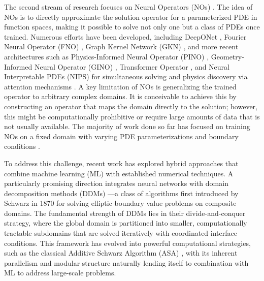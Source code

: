 \documentclass[preprint,11pt]{elsarticle}
\theoremstyle{plain}
\begin{document}
The second stream of research focuses on Neural Operators (NOs) \cite{kovachki2023neural}. The idea of NOs is to directly approximate the solution operator for a parameterized PDE in function spaces, making it possible to solve not only one but a class of PDEs once trained. Numerous efforts have been developed, including DeepONet \cite{lu2019deeponet}, Fourier Neural Operator (FNO) \cite{li2020fourier}, Graph Kernel Network (GKN) \cite{li2020neural}, and more recent architectures such as Physics-Informed Neural Operator (PINO) \cite{li2024physics}, Geometry-Informed Neural Operator (GINO) \cite{li2023geometry}, Transformer Operator \cite{calvello2024continuum}, and Neural Interpretable PDEs (NIPS) for simultaneous solving and physics discovery via attention mechanisms  \cite{liu2025neural}. A key limitation of NOs is generalizing the trained operator to arbitrary complex domains. It is conceivable to achieve this by constructing an operator that maps the domain directly to the solution; however, this might be computationally prohibitive or require large amounts of data that is not usually available. The majority of work done so far has focused on training NOs on a fixed domain with varying PDE parameterizations and boundary conditions \cite{goswami2023physics, li2023fourier}.

To address this challenge, recent work has explored hybrid approaches that combine machine learning (ML) with established numerical techniques. A particularly promising direction integrates neural networks with domain decomposition methods (DDMs) \cite{schwarz1870ueber, lions1988schwarz, smith1997domain, toselli2004domain}---a class of algorithms first introduced by Schwarz in 1870 for solving elliptic boundary value problems on composite domains. The fundamental strength of DDMs lies in their divide-and-conquer strategy, where the global domain is partitioned into smaller, computationally tractable subdomains that are solved iteratively with coordinated interface conditions. This framework has evolved into powerful computational strategies, such as the classical Additive Schwarz Algorithm (ASA) \cite{courant1987additive}, with its inherent parallelism and modular structure naturally lending itself to combination with ML to address large-scale problems.
\end{document}
